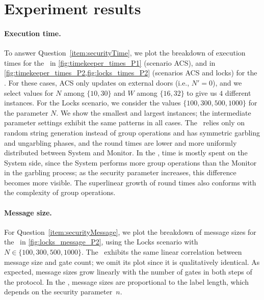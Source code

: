 \section{Experiment results}\label{sec:results}



\paragraph{Execution time.}
To answer Question~\ref{item:securityTime}, we plot the breakdown of execution times for the \protocolone~in \cref{fig:timekeeper_times_P1} (scenario ACS), and in \cref{fig:timekeeper_times_P2,fig:locks_times_P2} (scenarios ACS and locks) for the \protocoltwo. For these cases, ACS only updates on external doors (i.e., $N'=0$),
and we select values
for $N$ among $\{10,30\}$ and $W$ among $\{16,32\}$ to give us $4$ different instances.
For the Locks scenario, we consider the values $\{100, 300,500,1000\}$ for the parameter $N$. We show the smallest and largest instances; the intermediate parameter settings exhibit the same patterns in all cases. The \protocolone~relies only on random string generation instead of group operations and has symmetric garbling and ungarbling phases, and the round times are lower and more uniformly distributed between System and Monitor.
In the \protocoltwo, time is mostly spent on the System side, since the System performs more group operations than the Monitor in the garbling process; as the security parameter increases, this difference becomes more visible.
The superlinear growth of round times also conforms with the complexity of group operations.

\paragraph{Message size.}
For Question~\ref{item:securityMessage}, we plot the breakdown of message sizes for the \protocoltwo~in \cref{fig:locks_message_P2}, using the Locks scenario with $N \in \{100, 300, 500, 1000\}$.
The \protocolone~exhibits the same linear correlation between message size and gate count; we omit its plot since it is qualitatively identical.
As expected, message sizes grow linearly with the number of gates in both steps of the protocol.
In the \protocolone, message sizes are proportional to the label length, which depends on the security parameter~$n$.

